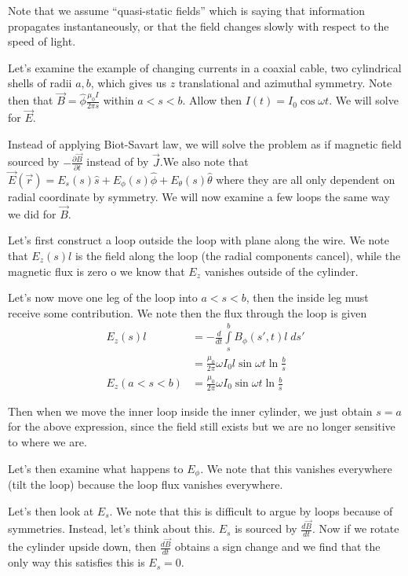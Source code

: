 \documentclass[10pt]{report}
\newcommand{\rd}[2]{\frac{d#1}{d#2}}
\newcommand{\pd}[2]{\frac{\partial #1}{\partial#2}}
\begin{document}
Note that we assume ``quasi-static fields'' which is saying that information propagates instantaneously, or that the field changes slowly with respect to the speed of light. 

Let's examine the example of changing currents in a coaxial cable, two cylindrical shells of radii $a,b$, which gives us $z$ translational and azimuthal symmetry. Note then that $\vec{B} = \hat{\phi}\frac{\mu_0I}{2\pi s}$ within $a < s < b$. Allow then $I(t) = I_0\cos\omega t$. We will solve for $\vec{E}$.

Instead of applying Biot-Savart law, we will solve the problem as if magnetic field sourced by $-\pd{\vec{B}}{t}$ instead of by $\vec{J}$.We also note that $\vec{E}(\vec{r}) = E_s(s)\hat{s} + E_\phi(s)\hat{\phi} + E_\theta(s)\hat{\theta}$ where they are all only dependent on radial coordinate by symmetry. We will now examine a few loops the same way we did for $\vec{B}$.

Let's first construct a loop outside the loop with plane along the wire. We note that $E_z(s)l$ is the field along the loop (the radial components cancel), while the magnetic flux is zero o we know that $E_z$ vanishes outside of the cylinder.

Let's now move one leg of the loop into $a < s < b$, then the inside leg must receive some contribution. We note then the flux through the loop is given
\begin{align}
    E_z(s)l &= -\rd{}{t}\int\limits_{s}^{b}B_\phi(s',t)l\;ds'\\
    &= \frac{\mu_0}{2\pi}\omega I_0 l \sin \omega t \ln \frac{b}{s}\\
    E_z(a < s < b) &= \frac{\mu_0}{2\pi}\omega I_0 \sin \omega t \ln \frac{b}{s}
\end{align}

Then when we move the inner loop inside the inner cylinder, we just obtain $s = a$ for the above expression, since the field still exists but we are no longer sensitive to where we are.

Let's then examine what happens to $E_\phi$. We note that this vanishes everywhere (tilt the loop) because the loop flux vanishes everywhere.

Let's then look at $E_s$. We note that this is difficult to argue by loops because of symmetries. Instead, let's think about this. $E_s$ is sourced by $\rd{\vec{B}}{t}$. Now if we rotate the cylinder upside down, then $\rd{\vec{B}}{t}$ obtains a sign change and we find that the only way this satisfies this is $E_s = 0$. 
\end{document}
